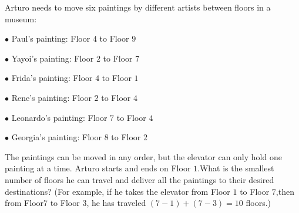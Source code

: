 Arturo needs to move six paintings by different artists between floors in a museum:

$\bullet$ Paul's painting: Floor $4$ to Floor $9$

$\bullet$ Yayoi's painting: Floor $2$ to Floor $7$

$\bullet$ Frida's painting: Floor $4$ to Floor $1$

$\bullet$ Rene's painting: Floor $2$ to Floor $4$

$\bullet$ Leonardo's painting: Floor $7$ to Floor $4$

$\bullet$ Georgia's painting: Floor $8$ to Floor $2$

The paintings can be moved in any order, but the elevator can only hold one painting at a time. Arturo starts and ends on Floor $1$.What is the smallest number of floors he can travel and deliver all the paintings to their desired destinations? (For example, if he takes the elevator from Floor $1$ to Floor $7$,then from Floor$7$ to Floor $3$, he has traveled $(7-1) +(7-3) = 10$ floors.)

